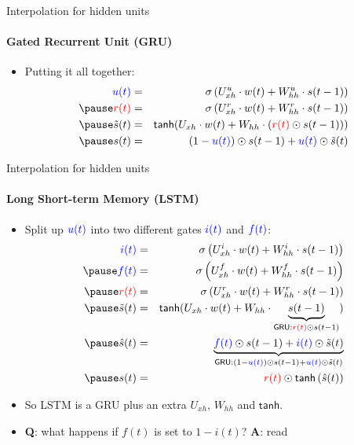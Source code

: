 \begin{frame}{Interpolation for hidden units}
\framesubtitle{Gated Recurrent Unit (GRU)}
\begin{itemize}[<+->]
	\item Putting it all together:
	\begin{eqnarray*}
		\textcolor{blue}{u(t)} &=& \sigma\left( U^u_{xh} \cdot w(t) + W^u_{hh} \cdot s(t-1) \right)  \\ \pause 
		\textcolor{red}{r(t)} &=& \sigma\left( U^r_{xh} \cdot w(t) + W^r_{hh} \cdot s(t-1) \right) \\ \pause 
		\tilde{s}(t) &=& \textsf{tanh}(U_{xh} \cdot w(t) + W_{hh} \cdot \left( \textcolor{red}{r(t)} \odot s(t-1) \right) ) \\ \pause 
		s(t) &=& (1-\textcolor{blue}{u(t)}) \odot s(t-1) + \textcolor{blue}{u(t)} \odot \tilde{s}(t) 
	\end{eqnarray*}
\end{itemize}
\end{frame}

\begin{frame}{Interpolation for hidden units}
\framesubtitle{Long Short-term Memory (LSTM)}
\begin{itemize}[<+->]
	\item Split up $\textcolor{blue}{u(t)}$ into two different gates $\textcolor{blue}{i(t)}$ and $\textcolor{blue}{f(t)}$:
	\begin{eqnarray*}
		\textcolor{blue}{i(t)} &=& \sigma\left( U^i_{xh} \cdot w(t) + W^i_{hh} \cdot s(t-1) \right)  \\ \pause
		\textcolor{blue}{f(t)} &=& \sigma\left( U^f_{xh} \cdot w(t) + W^f_{hh} \cdot s(t-1) \right)  \\ \pause
		\textcolor{red}{r(t)} &=& \sigma\left( U^r_{xh} \cdot w(t) + W^r_{hh} \cdot s(t-1) \right) \\ \pause 
		\tilde{s}(t) &=& \textsf{tanh}(U_{xh} \cdot w(t) + W_{hh} \cdot \underbrace{s(t-1)}_{\textsf{GRU}: \textcolor{red}{r(t)} \odot s(t-1)} ) \\ \pause 
		\hat{s}(t) &=& \underbrace{\textcolor{blue}{f(t)} \odot s(t-1) + \textcolor{blue}{i(t)} \odot \tilde{s}(t)}_{\textsf{GRU}: (1-\textcolor{blue}{u(t)}) \odot s(t-1) + \textcolor{blue}{u(t)} \odot \tilde{s}(t)} \\ \pause 
		s(t) &=& \textcolor{red}{r(t)} \odot \textsf{tanh}\left( \hat{s}(t) \right) 
	\end{eqnarray*}
	\item So LSTM is a GRU plus an extra $U_{xh}$, $W_{hh}$ and $\textsf{tanh}$.
	\item \textbf{Q}: what happens if $f(t)$ is set to $1 - i(t)$? \pause \textbf{A}: read~\cite{Greff2017}
\end{itemize}
\end{frame}

